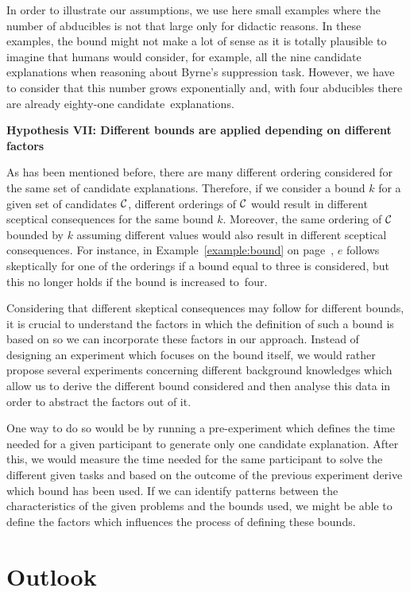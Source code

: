 In order to illustrate our assumptions, we use here small examples where the number of abducibles is not that large only for didactic reasons. In these examples, the bound might not make a lot of sense as it is totally plausible to imagine that humans would consider, for example, all the nine candidate explanations when reasoning about Byrne's suppression task. However, we have to consider that this number grows exponentially and, with four abducibles there are already eighty-one candidate~explanations.

\textbf{Hypothesis VII: Different bounds are applied depending on different factors}

As has been mentioned before, there are many different ordering considered for the same set of candidate explanations. Therefore, if we consider a bound $k$ for a given set of candidates $\mathcal{C}$, different orderings of $\mathcal{C}$ would result in different sceptical consequences for the same bound $k$. Moreover, the same ordering of $\mathcal{C}$ bounded by $k$ assuming different values would also result in different sceptical consequences. For instance, in Example~\ref{example:bound} on page~\pageref{example:bound}, $e$ follows skeptically for one of the orderings if a bound equal to three is considered, but this no longer holds if the bound is increased to~four.

Considering that different skeptical consequences may follow for different bounds, it is crucial to understand the factors in which the definition of such a bound is based on so we can incorporate these factors in our approach. Instead of designing an experiment which focuses on the bound itself, we would rather propose several experiments concerning different background knowledges which allow us to derive the different bound considered and then analyse this data in order to abstract the factors out of it.

One way to do so would be by running a pre-experiment which defines the time needed for a given participant to generate only one candidate explanation. After this, we would measure the time needed for the same participant to solve the different given tasks and based on the outcome of the previous experiment derive which bound has been used. If we can identify patterns between the characteristics of the given problems and the bounds used, we might be able to define the factors which influences the process of defining these bounds.

\section{Outlook}


